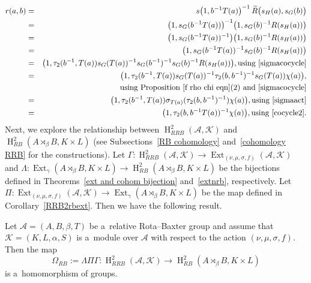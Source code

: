 \documentclass{jonasart}
\theoremstyle{plain}
\DeclareMathOperator{\Ext}{Ext}
\DeclareMathOperator{\Ho}{H}
\begin{document}
	\begin{eqnarray}
		r (a,b) &=&s \big(1,b^{-1}T(a) \big)^{-1}\, \widetilde{R} \big(s_H (a),s_G (b)\big)\nonumber\\
		&=&\big(1,s_G (b^{-1}T(a))\big)^{-1}\big(1,s_G (b)^{-1}R(s_H (a))\big)\nonumber\\
		&=&\big(1,s_G (b^{-1}T(a))^{-1}\big)\big(1,s_G (b)^{-1}R(s_H (a))\big)\nonumber\\
		&=&\big(1,s_G (b^{-1}T(a))^{-1}s_G (b)^{-1}R(s_H (a))\big)\nonumber\\
		&=&\big(1,\tau_2 (b^{-1},T(a))s_G (T(a))^{-1}s_G (b^{-1})^{-1}s_G (b)^{-1}R(s_H (a))\big), \text{using~\eqref{sigmacocycle}}\nonumber\\
		&=&\big(1,\tau_2 (b^{-1},T(a))s_G (T(a))^{-1}\tau_2 (b,b^{-1})^{-1}s_G (T(a))\chi(a)\big),\nonumber\\
		&& \text{using Proposition~\eqref{f rho chi eqn}(2) and~\eqref{sigmacocycle}}\nonumber\\
		&=&\big(1,\tau_2 (b^{-1},T(a))\sigma_{T(a)}(\tau_2 (b,b^{-1})^{-1})\chi(a)\big), \text{using~\eqref{sigmaact}}\nonumber\\
		&=&\big(1,\tau_2 (b,b^{-1}T(a))^{-1}\chi(a)\big), \text{using~\eqref{cocycle2}.\label{g cocycle term}}
	\end{eqnarray}
	Next, we explore the relationship between $\Ho^2_{RRB}(\mathcal{A}, \mathcal{K})$ and $\Ho^2_{RB}(A\rtimes_\beta B, K\times L)$ (see Subsections~\ref{RB cohomology} and~\ref{cohomology RRB} for the constructions). Let $\Gamma: \Ho^2_{RRB}(\mathcal{A}, \mathcal{K}) \to \Ext_{(\nu, \mu, \sigma, f)}(\mathcal{A}, \mathcal{K})$ and $\Lambda:\Ext_{\gamma}(A\rtimes_\beta B, K\times L) \to \Ho^2_{RB}(A\rtimes_\beta B, K\times L)$ be the bijections defined in Theorems~\ref{ext and cohom bijection} and~\ref{extnrb}, respectively. Let $\Pi: \Ext_{(\nu, \mu, \sigma, f)}(\mathcal{A}, \mathcal{K}) \to \Ext_{\gamma}(A\rtimes_\beta B, K\times L)$ be the map defined in Corollary~\ref{RRB2rbext}. Then we have the following result.
	
	\begin{proposition}\label{cohom RRB to cohom RB}
		Let $\mathcal{A}= (A,B, \beta, T)$ be a~relative Rota--Baxter group and assume that $\mathcal{K} = (K, L, \alpha, S)$ is a~module over $\mathcal{A}$ with respect to the action $(\nu, \mu,\sigma, f)$. Then the map
		\[
		\Omega_{RB}:=\Lambda \Pi \Gamma: \Ho^2_{RRB}(\mathcal{A}, \mathcal{K}) \to \Ho^2_{RB}(A\rtimes_\beta B, K\times L)
		\]
		is a~homomorphism of groups.
	\end{proposition}
	
\end{document}
